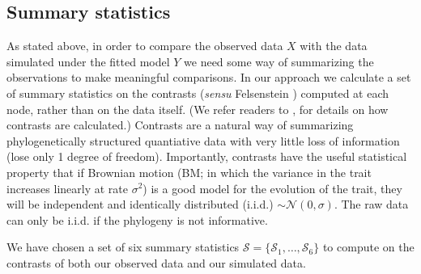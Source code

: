 \documentclass[a4paper,12pt]{article}
\begin{document}
\subsection{Summary statistics}
As stated above, in order to compare the observed data $X$ with the data simulated under the fitted model $Y$ we need some way of summarizing the observations to make meaningful comparisons. 
In our approach we calculate a set of summary statistics on the contrasts (\textit{sensu} Felsenstein \citep{Felsenstein1985}) computed at each node, rather than on the data itself. (We refer readers to \citep{Felsenstein1985, Rohlf2001, Blomberg2012}, for details on how contrasts are calculated.) Contrasts are a natural way of summarizing phylogenetically structured quantiative data with very little loss of information (lose only 1 degree of freedom). Importantly, contrasts have the useful statistical property that if Brownian motion (BM; in which the variance in the trait increases linearly at rate $\sigma^2$) is a good model for the evolution of the trait, they will be independent and identically distributed (i.i.d.) $\sim \mathcal{N}(0, \sigma)$. The raw data can only be i.i.d. if the phylogeny is not informative. 

We have chosen a set of six summary statistics $\mathcal{S} = \lbrace \mathcal{S}_1, \ldots, \mathcal{S}_6 \rbrace$ to compute on the contrasts of both our observed data and our simulated data.
\end{document}
